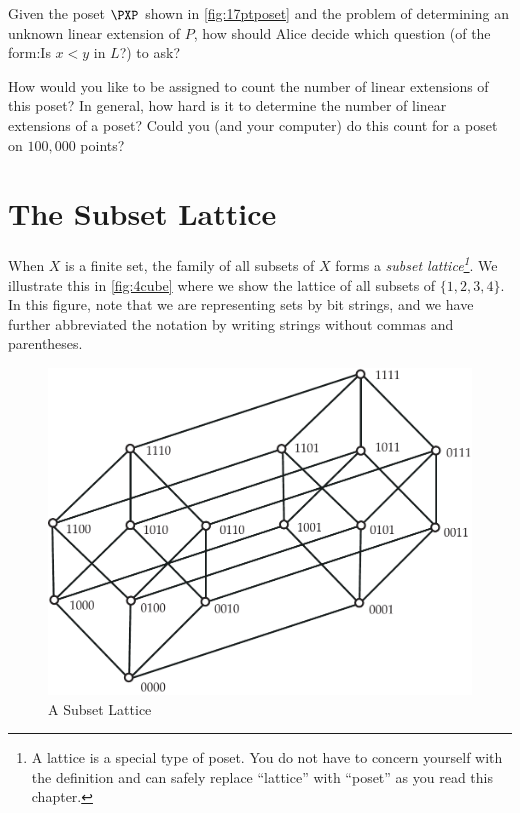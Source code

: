 \begin{remark}
Given the poset $\PXP$ shown in \autoref{fig:17ptposet} and the problem of 
determining an unknown linear extension of $P$, how should Alice decide 
which question (of the form:\quad Is $x<y$ in $L$?) to ask?  

How would you like to be assigned to count the
number of linear extensions of this poset?  In general, 
how hard is it to determine the number of linear extensions of a poset?
Could you (and your computer) do this count for a poset on $100,000$ points?
\end{remark}

\section{The Subset Lattice}\label{s:posets:subset-lattice}

When $X$ is a finite set, the family of all subsets of $X$ forms a
\textit{subset lattice\footnote{A lattice is a special type of
    poset. You do not have to concern yourself with the definition and
    can safely replace ``lattice'' with ``poset'' as you read this
    chapter.}}.  We illustrate this in \autoref{fig:4cube} where we
show the lattice of all subsets of $\{1,2,3,4\}$. In this figure, note
that we are representing sets by bit strings, and we have further
abbreviated the notation by writing strings without commas and
parentheses.

\begin{figure}
\begin{center}
\includegraphics*[scale=.4]{posets-figs/4cube.pdf}
\caption{A Subset Lattice}
\label{fig:4cube}
\end{center}
\end{figure}

